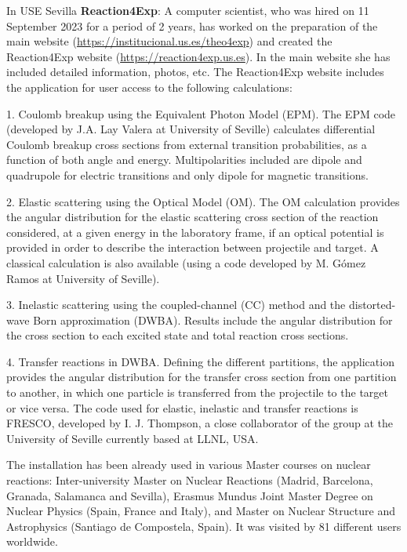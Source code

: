 In USE Sevilla \textbf{Reaction4Exp}: A computer scientist, who was hired on 11 September 2023 for a period of 2 years, has worked on the preparation of the main website (\url{https://institucional.us.es/theo4exp}) and  created the Reaction4Exp website (\url{https://reaction4exp.us.es}). In the main website she has included detailed information, photos, etc. The Reaction4Exp website includes the application for user access to the following calculations:

1. Coulomb breakup using the Equivalent Photon Model (EPM). The EPM code (developed by J.A. Lay Valera at University of Seville) calculates differential Coulomb breakup cross sections from external transition probabilities, as a function of both angle and energy. Multipolarities included are dipole and quadrupole for electric transitions and only dipole for magnetic transitions.

2. Elastic scattering using the Optical Model (OM). The OM calculation provides the angular distribution for the elastic scattering cross section of the reaction considered, at a given energy in the laboratory frame, if an optical potential is provided in order to describe the interaction between projectile and target. A classical calculation is also available (using a code developed by M. Gómez Ramos at University of Seville).

3. Inelastic scattering using the coupled-channel (CC) method and the distorted-wave Born approximation (DWBA). Results include the angular distribution for the cross section to each excited state and total reaction cross sections. 

4. Transfer reactions in DWBA. Defining the different partitions, the application provides the angular distribution for the transfer cross section from one partition to another, in which one particle is transferred from the projectile to the target or vice versa.
The code used for elastic, inelastic and transfer reactions is FRESCO, developed by I. J. Thompson, a close collaborator of the group at the University of Seville currently based at LLNL, USA.

The installation has been already used in various Master courses on nuclear reactions: Inter-university Master on Nuclear Reactions (Madrid, Barcelona, Granada, Salamanca and Sevilla), Erasmus Mundus Joint Master Degree on Nuclear Physics (Spain, France and Italy), and Master on Nuclear Structure and Astrophysics (Santiago de Compostela, Spain). It was visited by 81 different users worldwide.

